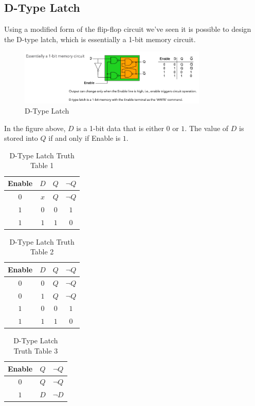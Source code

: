 \documentclass[a4paper]{article}
\theoremstyle{plain}
\theoremstyle{definition}
\theoremstyle{remark}
\begin{document}
\subsection{D-Type Latch}
Using a modified form of the flip-flop circuit we've seen it is possible to design the D-type latch, which is essentially a 1-bit memory circuit.
\begin{figure}[H]
	\centering
	\includegraphics[width=0.8\textwidth]{figures/latch.png}
	\caption{D-Type Latch}
	\label{fig:figures-latch-png}
\end{figure}
In the figure above, $D$ is a 1-bit data that is either $0$ or $1$. The value of $D$ is stored into $Q$ if and only if Enable is  $1$. 
\begin{table}[H]
	\centering
	\caption{D-Type Latch Truth Table 1}
	\label{tab:table1}
	\begin{tabular}{cc|cc}
	Enable & $D$ & $Q$ & $\neg Q$ \\
	\hline
	$ 0$ & $x$ & $Q$ & $\neg Q$ \\
	$1$ & $0$ & $0$ & $1$ \\
	$1$ & $1$ & $1$ & $0$ \\
	\hline
	\end{tabular}
\end{table}
\begin{table}[H]
	\centering
	\caption{D-Type Latch Truth Table 2}
	\label{tab:table2}
	\begin{tabular}{cc|cc}
	Enable & $D$ & $Q$ & $\neg Q$ \\
	\hline
	$0$ & $0$ & $Q$ &  $\neg Q$ \\
	$0$ & $1$ & $Q$ & $\neg Q$ \\
	$1$ & $0$ & $0$ & $1$ \\
	$1$ & $1$ & $1$ & $0$ \\
	\hline
	\end{tabular}
\end{table}
\begin{table}[H]
	\centering
	\caption{D-Type Latch Truth Table 3}
	\label{tab:table3}
	\begin{tabular}{c|cc}
	Enable & $Q$ & $\neg Q$ \\
	\hline
	$0$ & $Q$ & $\neg Q$ \\
	$1$ & $D$ & $\neg D$ \\
	\hline
	\end{tabular}
\end{table}
\end{document}
